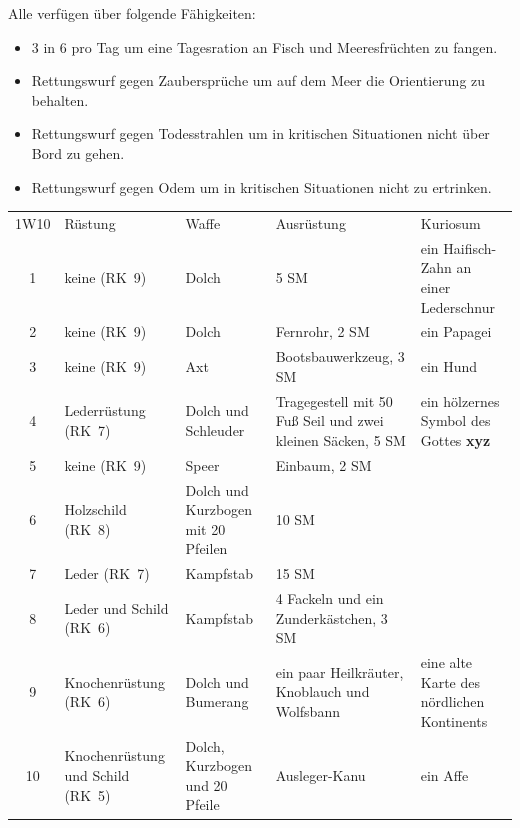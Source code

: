 \documentclass[11pt]{wbzine}
\begin{document}
\begin{multicols}{2}
Alle verfügen über folgende Fähigkeiten:

\begin{itemize}
    \item 3 in 6 pro Tag um eine Tagesration an Fisch und Meeresfrüchten zu
fangen.

\item Rettungswurf gegen Zaubersprüche um auf dem Meer die Orientierung
zu behalten.

\item Rettungswurf gegen Todesstrahlen um in kritischen Situationen
nicht über Bord zu gehen.

\item Rettungswurf gegen Odem um in kritischen Situationen nicht zu
ertrinken.
\end{itemize}

\end{multicols}
\begin{tabularx}{\textwidth}{cZZZZ}
    1W10 & Rüstung & Waffe & Ausrüstung & Kuriosum \\
1 &
    keine (RK~9) &
    Dolch &
    5 SM &
    ein Haifisch-Zahn an einer Lederschnur \\

2 &
    keine (RK~9) &
    Dolch &
    Fernrohr, 2 SM &
    ein Papagei \\

3 &
 keine (RK~9) &
   Axt &
  Bootsbauwerkzeug, 3 SM &
  ein Hund \\

4 &
 Lederrüstung (RK~7) &
 Dolch und Schleuder &
 Tragegestell mit 50 Fuß Seil und zwei kleinen Säcken, 5 SM &
 ein hölzernes Symbol des Gottes \textbf{xyz} \\

5 &
 keine (RK~9) &
 Speer &
 Einbaum, 2 SM &
 \\

6 &
 Holzschild (RK~8) &
 Dolch und Kurzbogen mit 20 Pfeilen & 
 10 SM &
\\

7 &
 Leder (RK~7) &
 Kampfstab &
 15 SM &
\\

8 &
 Leder und Schild (RK~6) &
 Kampfstab &
 4 Fackeln und ein Zunderkästchen, 3 SM &
\\

9 &
 Knochenrüstung (RK~6) &
 Dolch und Bumerang &
 ein paar Heilkräuter, Knoblauch und Wolfsbann &
 eine alte Karte des nördlichen Kontinents \\

10 &
 Knochenrüstung und Schild (RK~5) &
 Dolch, Kurzbogen und 20 Pfeile &
 Ausleger-Kanu &
 ein Affe \\

\end{tabularx}
\end{document}
